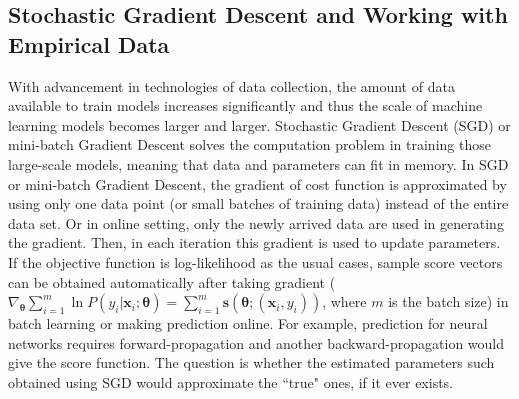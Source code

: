 \documentclass[twoside,11pt]{article}
\begin{document}
\subsection{Stochastic Gradient Descent and Working with Empirical Data}
\label{ss:sgd_score}
With advancement in technologies of data collection, the amount of data available to train models increases significantly and thus the scale of machine learning models becomes larger and larger. Stochastic Gradient Descent (SGD) or mini-batch Gradient Descent solves the computation problem in training those large-scale models, meaning that data and parameters can fit in memory. In SGD or mini-batch Gradient Descent, the gradient of cost function is approximated by using only one data point (or small batches of training data) instead of the entire data set. Or in online setting, only the newly arrived data are used in generating the gradient. Then, in each iteration this gradient is used to update parameters. If the objective function is log-likelihood as the usual cases, sample score vectors can be obtained automatically after taking gradient ($\nabla _{\bm { \theta}} \sum _{i=1} ^{m} \ln P(y_i|\bm {x}_i;\bm{\theta}) = \sum _{i=1} ^{m} \bm{s}(\bm { \theta};(\bm {x}_i, y_i))$, where $m$ is the batch size) in batch learning or making prediction online. For example, prediction for neural networks requires forward-propagation and another backward-propagation would give the score function. The question is whether the estimated parameters such obtained using SGD would approximate the ``true" ones, if it ever exists.
\end{document}
